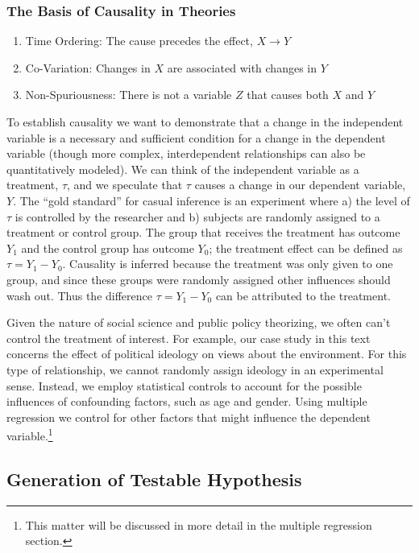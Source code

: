 \documentclass[11pt,openany]{book}\usepackage[]{graphicx}\usepackage[]{color}
\begin{document}
\subsubsection{The Basis of Causality in Theories}
  \begin{enumerate}
  \item Time Ordering: The cause precedes the effect, $X \rightarrow Y$
  \item Co-Variation: Changes in $X$ are associated with changes in $Y$
  \item Non-Spuriousness: There is not a variable $Z$ that causes both
    $X$ and $Y$  
  \end{enumerate}

To establish causality we want to demonstrate that a change in the independent variable is a necessary and sufficient condition for a change in the dependent variable (though more complex, interdependent relationships can also be quantitatively modeled). We can think of the independent variable as a treatment, $\tau$, and we speculate that $\tau$ causes a change in our dependent variable, $Y$. The ``gold standard'' for casual inference is an experiment where a) the level of $\tau$ is controlled by the researcher and b) subjects are randomly assigned to a treatment or control group. The group that receives the treatment has outcome $Y_1$ and the control group has outcome $Y_0$; the treatment effect can be defined as $\tau = Y_1-Y_0$. Causality is inferred because the treatment was only given to one group, and since these groups were randomly assigned other influences should wash out. Thus the difference $\tau = Y_1-Y_0$ can be attributed to the treatment.

Given the nature of social science and public policy theorizing, we often can't control the treatment of interest. For example, our case study in this text concerns the effect of political ideology on views about the environment. For this type of relationship, we cannot randomly assign ideology in an experimental sense. Instead, we employ statistical controls to account for the possible influences of confounding factors, such as age and gender. Using multiple regression we control for other factors that might influence the dependent variable.\footnote{This matter will be discussed in more detail in the multiple regression section.}

\subsection{Generation of Testable Hypothesis}
\end{document}
